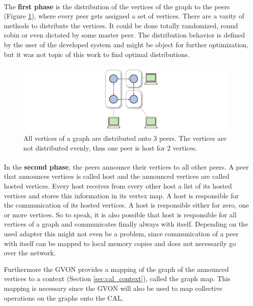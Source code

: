 \paragraph*{}
The \textbf{first phase} is the distribution of the vertices of the graph to
the peers (Figure \ref{fig:gvon_mapping}), where every peer gets
assigned a set of vertices. There are a varity of methods to
distribute the vertices.  It could be done totally randomized, round
robin or even dictated by some master peer. The distribution behavior
is defined by the user of the developed system and might be object for
further optimization, but it was not topic of this work to find optimal
distributions.

\begin{figure}[H]
  \centering \includegraphics[width=\textwidth]{graphics/30_gvon_mapping}
  \caption{All vertices of a graph are distributed onto 3 peers. The vertices
  are not distributed evenly, thus one peer is host for 2 vertices.}
  \label{fig:gvon_mapping}
\end{figure}

\paragraph*{}
In the \textbf{second phase}, the peers announce their vertices to all other
peers.  A peer that announces vertices is called host and the
announced vertices are called hosted vertices.  Every host receives
from every other host a list of its hosted vertices and stores this
information in its vertex map. A host is responsible for the
communication of its hosted vertices. A host is responsible either for
zero, one or more vertices. So to speak, it is also possible that host
is responsible for all vertices of a graph and communicates finally
always with itself.  Depending on the used adapter this might not even
be a problem, since communication of a peer with itself can be mapped
to local memory copies and does not necessarily go over the network.

Furthermore the GVON provides a mapping of the graph of the announced
vertices to a context (Section \ref{sec:cal_context}), called the
graph map. This mapping is necessary since the GVON will also be used
to map collective operations on the graphs onto the CAL.

